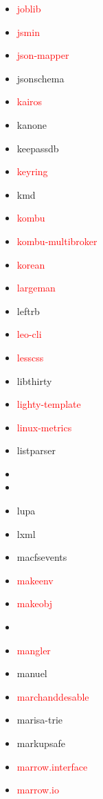 \documentclass{l4proj}
\begin{document}
\begin{appendices}
{\begin{itemize}
\end{itemize}
}%
\clearpage
\noindent\parbox[t]{0.32\textwidth}{\raggedright%
\begin{itemize}
\item\textcolor{red}{joblib}
\item\textcolor{red}{jsmin}
\item\textcolor{red}{json-mapper}
\item jsonschema
\item\textcolor{red}{kairos}
\item kanone
\item keepassdb
\item\textcolor{red}{keyring}
\item kmd
\item\textcolor{red}{kombu}
\item\textcolor{red}{kombu-multibroker}
\item\textcolor{red}{korean}
\item\textcolor{red}{largeman}
\item leftrb
\item\textcolor{red}{leo-cli}
\item\textcolor{red}{lesscss}
\item libthirty
\item\textcolor{red}{lighty-template}
\item\textcolor{red}{linux-metrics}
\item listparser
\item {}
\item {}
\item lupa
\item lxml
\item macfsevents
\item\textcolor{red}{makeenv}
\item\textcolor{red}{makeobj}
\item\textcolor{red}{}
\item\textcolor{red}{mangler}
\item manuel
\end{itemize}
}%
\noindent\parbox[t]{0.32\textwidth}{\raggedright%
\begin{itemize}
\item\textcolor{red}{marchanddesable}
\item marisa-trie
\item markupsafe
\item\textcolor{red}{marrow.interface}
\item\textcolor{red}{marrow.io}

\end{itemize}}
\end{appendices}
\end{document}
